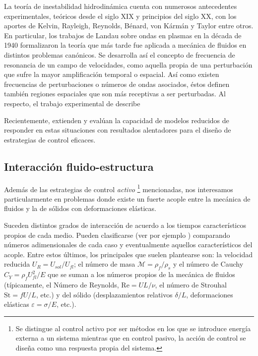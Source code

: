 \documentclass[12pt]{article}
\begin{document}
 La teoría de inestabilidad hidrodinámica cuenta con numerosos antecedentes experimentales, teóricos desde el siglo XIX y principios del siglo XX, con los aportes de Kelvin, Rayleigh, Reynolds, Bénard, von Kármán y Taylor entre otros. En particular, los trabajos de Landau\cite{landau1985} sobre ondas en plasmas en la década de 1940 formalizaron la teoría que más tarde fue aplicada a mecánica de fluidos en distintos problemas canónicos\cite{gaster1965role,mattingly1972stability,huerre1985absolute,trianta1986}. Se desarrolla así el concepto de frecuencia de resonancia de un campo de velocidades, como aquella propia de una perturbación que sufre la mayor amplificación temporal o espacial. Así como existen frecuencias de perturbaciones o números de ondas asociados, éstos definen también regiones espaciales que son más receptivas a ser perturbadas. Al respecto, el trabajo experimental de \cite{strykowski1990formation} describe 
 
Recientemente,  \citet{herrmann2020modeling} extienden y evalúan la capacidad de modelos reducidos de responder en estas situaciones con resultados alentadores para el diseño de estrategias de control eficaces.
 

 \subsection*{Interacción fluido-estructura}
 
 Además de las estrategias de control \textit{activo }\footnote{Se distingue al control activo por ser métodos en los que se introduce energía externa a un sistema mientras que en control pasivo, la acción de control se diseña como una respuesta propia del sistema. } mencionadas, nos interesamos particularmente en problemas donde existe un fuerte acople entre la mecánica de fluidos y la de sólidos con deformaciones  elásticas.	
 	
Suceden distintos grados de interacción de acuerdo a los tiempos característicos propios de cada medio. Pueden clasificarse (ver por ejemplo \cite{paidoussis2010fluid,delangre2001fluides}) comparando números adimensionales de cada caso y eventualmente aquellos característicos del acople.
Entre estos últimos,  los principales que suelen plantearse son: la velocidad reducida $U_R=U_{sol}/U_{fl}$; el número de masa $\mathcal{M}=\rho_f/\rho_s$ y el número de Cauchy $C_Y=\rho_fU_{fl}^2/E$ que se suman a los números propios de la mecánica de fluidos (típicamente, el Número de Reynolds, $\mathrm{Re}=UL/\nu$, el número de Strouhal $\mathrm{St}=fU/L$, etc.) y del sólido (desplazamientos relativos $\delta/L$, deformaciones elásticas $\varepsilon=\sigma/E$, etc.). 
\end{document}
